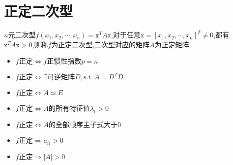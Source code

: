 \section{正定二次型}
\begin{definition}[正定矩阵]
	$n$元二次型$f(x_{1},x_{2},\cdots,x_{n})=\mathtt{x}^{T}A\mathtt{x}$,对于任意$\mathtt{x}=[x_{1},x_{2},\cdots,x_{n}]^{T}\neq 0$,都有$\mathtt{x}^{T}A\mathtt{x}>0$,则称$f$为正定二次型,二次型对应的矩阵$A$为正定矩阵.
	\begin{corollary}[二次型正定充要]
		\begin{itemize}
			\item $f\text{正定}\Leftrightarrow f\text{正惯性指数}p=n$
			\item $f\text{正定}\Leftrightarrow \exists \text{可逆矩阵}D,\text{s.t.}\ A=D^{T}D$
			\item $f\text{正定}\Leftrightarrow A\simeq E$
			\item $f\text{正定}\Leftrightarrow A\text{的所有特征值}\lambda_{i}>0$
			\item $f\text{正定}\Leftrightarrow A\text{的全部顺序主子式大于}0$
		\end{itemize}
	\end{corollary}
	\begin{corollary}[二次型正定必要]
		\begin{itemize}
			\item $f\text{正定}\Rightarrow a_{ii}>0$
			\item $f\text{正定}\Rightarrow |A|>0$
		\end{itemize}
	\end{corollary}
\end{definition}